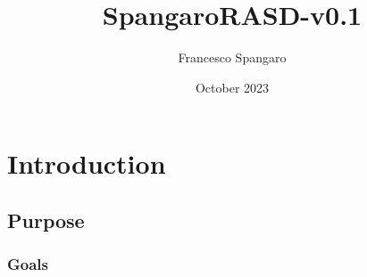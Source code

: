 \documentclass{article}
\title{SpangaroRASD-v0.1}
\author{Francesco Spangaro}
\date{October 2023}
\begin{document}
\maketitle

\tableofcontents
\section{Introduction}
\subsection{Purpose}
\subsubsection{Goals}
\begin{description}
    


\end{description}
\end{document}
